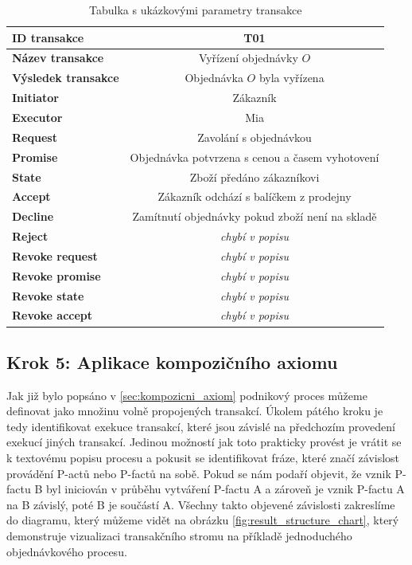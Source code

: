 \begin{table} [htbp] 
\centering
\begin{tabular}{|>{\bfseries} l| | c |}
\hline
  ID transakce & T01 \\
\hline
  Název transakce & Vyřízení objednávky $O$  \\
\hline
  Výsledek transakce & Objednávka $O$ byla vyřízena \\
\hline
  Initiator & Zákazník \\
\hline
  Executor & Mia \\
\hline
\hline
  Request & Zavolání s objednávkou \\
\hline
  Promise & Objednávka potvrzena s cenou a časem vyhotovení \\
\hline
  State & Zboží předáno zákazníkovi \\
\hline
  Accept & Zákazník odchází s balíčkem z prodejny \\
\hline
\hline
  Decline & Zamítnutí objednávky pokud zboží není na skladě \\
\hline
  Reject & \textit{chybí v popisu} \\
\hline
\hline
  Revoke request & \textit{chybí v popisu} \\
\hline
  Revoke promise & \textit{chybí v popisu} \\
\hline
  Revoke state & \textit{chybí v popisu} \\
\hline
  Revoke accept & \textit{chybí v popisu} \\
\hline
\end{tabular}
\caption{Tabulka s ukázkovými parametry transakce}
\label{tab:trans_param}
\end{table}

\subsection{Krok 5: Aplikace kompozičního axiomu}
Jak již bylo popsáno v \ref{sec:kompozicni_axiom} podnikový proces můžeme definovat jako množinu volně propojených transakcí. Úkolem pátého kroku je tedy identifikovat exekuce transakcí, které jsou závislé na předchozím provedení exekucí jiných transakcí. Jedinou možností jak toto prakticky provést je vrátit se k textovému popisu procesu a pokusit se identifikovat fráze, které značí závislost provádění P-actů nebo P-factů na sobě. Pokud se nám podaří objevit, že vznik P-factu B byl iniciován v průběhu vytváření P-factu A a zároveň je vznik P-factu A na B závislý, poté B je součástí A.  Všechny takto objevené závislosti zakreslíme do diagramu, který můžeme vidět na obrázku \ref{fig:result_structure_chart}, který demonstruje vizualizaci transakčního stromu na příkladě jednoduchého objednávkového procesu.


